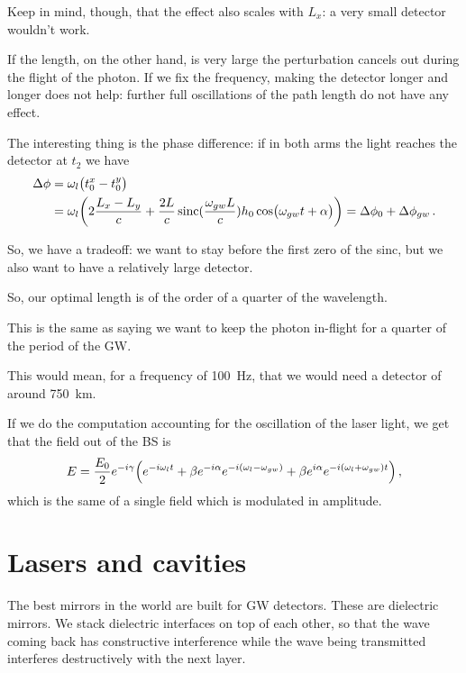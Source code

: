 \documentclass[main.tex]{subfiles}
\begin{document}
Keep in mind, though, that the effect also scales with \(L_x\): a very small detector wouldn't work. 

If the length, on the other hand, is very large the perturbation cancels out during the flight of the photon.  
If we fix the frequency, making the detector longer and longer does not help: further full oscillations of the path length do not have any effect.

The interesting thing is the phase difference: if in both arms the light reaches the detector at \(t_2 \) we have 
%
\begin{subequations}
\begin{align}
\Delta \phi 
&= \omega_{l} \qty(t_0^{x }- t_0^{y}) \\
&= \omega_{l} \qty(2 \frac{L_x -L_y}{c} + \frac{2L}{c} \operatorname{sinc}(\frac{\omega_{gw} L}{c} ) h_0 \cos(\omega_{gw} t + \alpha )) = \Delta \phi_0 + \Delta \phi_{gw}
\,.
\end{align}
\end{subequations}

So, we have a tradeoff: we want to stay before the first zero of the sinc, but we also want to have a relatively large detector.

So, our optimal length is of the order of a quarter of the wavelength.

This is the same as saying we want to keep the photon in-flight for a quarter of the period of the GW. 

This would mean, for a frequency of \SI{100}{Hz}, that we would need a detector of around \SI{750}{km}.

If we do the computation accounting for the oscillation of the laser light, we get that the field out of the BS is 
%
\begin{align}
E = \frac{E_0}{2} e^{-i \gamma } \qty(e^{-i \omega_{l} t}
+ \beta e^{-i \alpha } e^{-i (\omega_{l} - \omega_{gw})} + \beta e^{i \alpha } e^{-i (\omega_{l} + \omega_{gw}) t})
\,,
\end{align}
%
which is the same of a single field which is modulated in amplitude.

\section{Lasers and cavities}

The best mirrors in the world are built for GW detectors.
These are dielectric mirrors.
We stack dielectric interfaces on top of each other, so that the wave coming back has constructive interference while the wave being transmitted interferes destructively with the next layer.
\end{document}
